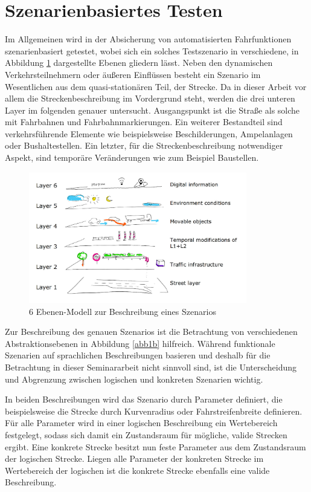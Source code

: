 \section{Szenarienbasiertes Testen}
Im Allgemeinen wird in der Absicherung von automatisierten Fahrfunktionen szenarienbasiert getestet, wobei sich ein solches Testszenario in verschiedene, in Abbildung \ref{abb1} dargestellte Ebenen gliedern lässt.\cite{Szenarienbeschreibung.2019} Neben den dynamischen Verkehrsteilnehmern oder äußeren Einflüssen besteht ein Szenario im Wesentlichen aus dem quasi-stationären Teil, der Strecke. Da in dieser Arbeit vor allem die Streckenbeschreibung im Vordergrund steht, werden die drei unteren Layer im folgenden genauer untersucht.
Ausgangspunkt ist die Straße als solche mit Fahrbahnen und Fahrbahnmarkierungen. Ein weiterer Bestandteil sind verkehrsführende Elemente wie beispielsweise Beschilderungen, Ampelanlagen oder Bushaltestellen. Ein letzter, für die Streckenbeschreibung notwendiger Aspekt, sind temporäre Veränderungen wie zum Beispiel Baustellen.

\begin{figure}[!h]
\flushleft
\center \includegraphics[width=0.85\textwidth]{fig/fig1.png}
\caption{6 Ebenen-Modell zur Beschreibung eines Szenarios \cite{Eckstein.2018}}
\label{abb1}
\end{figure}

Zur Beschreibung des genauen Szenarios ist die Betrachtung von verschiedenen Abstraktionsebenen in Abbildung \ref{abb1b} hilfreich. Während funktionale Szenarien auf sprachlichen Beschreibungen basieren und deshalb für die Betrachtung in dieser Seminararbeit nicht sinnvoll sind, ist die Unterscheidung und Abgrenzung zwischen logischen und konkreten Szenarien wichtig.

In beiden Beschreibungen wird das Szenario durch Parameter definiert, die beispielsweise die Strecke durch Kurvenradius oder Fahrstreifenbreite definieren. Für alle Parameter wird in einer logischen Beschreibung ein Wertebereich festgelegt, sodass sich damit ein Zustandsraum für mögliche, valide Strecken ergibt. Eine konkrete Strecke besitzt nun feste Parameter aus dem Zustandsraum der logischen Strecke. Liegen alle Parameter der konkreten Strecke im Wertebereich der logischen ist die konkrete Strecke ebenfalls eine valide Beschreibung.\cite{Szenarienbeschreibung.2019}

